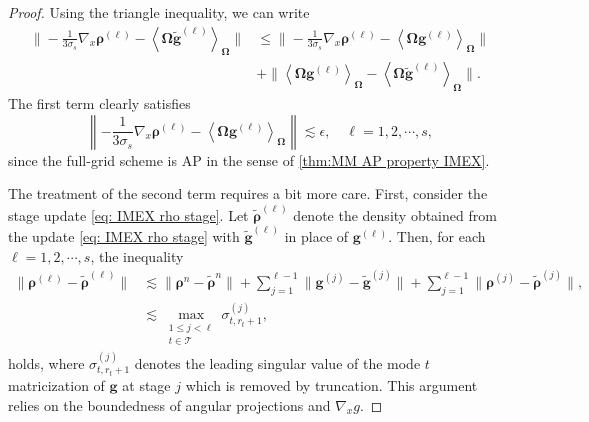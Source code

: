 \documentclass[onefignum,onetabnum]{siamart220329}
\begin{document}
\begin{proof}
    Using the triangle inequality, we can write
    \begin{align*}
        \Bigg\lVert -\frac{1}{3\sigma_s} \nabla_x \boldsymbol{\rho}^{(\ell)} - \left\langle \mathbf{\Omega} \widetilde{\mathbf{g}}^{(\ell)} \right\rangle_{\mathbf{\Omega}} \Bigg\rVert &\leq \Bigg\lVert -\frac{1}{3\sigma_s} \nabla_x \boldsymbol{\rho}^{(\ell)} - \left\langle \mathbf{\Omega} \mathbf{g}^{(\ell)} \right\rangle_{\mathbf{\Omega}} \Bigg\rVert \\ &+ \Bigg\lVert \left\langle \mathbf{\Omega} \mathbf{g}^{(\ell)} \right\rangle_{\mathbf{\Omega}} - \left\langle \mathbf{\Omega}\widetilde{\mathbf{g}}^{(\ell)} \right\rangle_{\mathbf{\Omega}} \Bigg\rVert.
    \end{align*}
    The first term clearly satisfies
    \begin{equation*}
        \left\lVert -\frac{1}{3\sigma_s} \nabla_x \boldsymbol{\rho}^{(\ell)} - \left\langle \mathbf{\Omega} \mathbf{g}^{(\ell)} \right\rangle_{\mathbf{\Omega}} \right\rVert \lesssim \epsilon, \quad \ell = 1,2, \cdots, s,
    \end{equation*}
    since the full-grid scheme is AP in the sense of \cref{thm:MM AP property IMEX}.

    The treatment of the second term requires a bit more care. First, consider the stage update \eqref{eq: IMEX rho stage}. Let $\widetilde{\boldsymbol{\rho}}^{(\ell)}$ denote the density obtained from the update \eqref{eq: IMEX rho stage} with $\widetilde{\mathbf{g}}^{(\ell)}$ in place of $\mathbf{g}^{(\ell)}$. Then, for each $\ell = 1, 2, \cdots, s$, the inequality
    \begin{align}
        \Big\lVert \boldsymbol{\rho}^{(\ell)} - \widetilde{\boldsymbol{\rho}}^{(\ell)} \Big\rVert &\lesssim \Big\lVert \boldsymbol{\rho}^{n} - \widetilde{\boldsymbol{\rho}}^{n} \Big\rVert  + \sum_{j=1}^{\ell-1} \Big\lVert \mathbf{g}^{(j)} - \widetilde{\mathbf{g}}^{(j)} \Big\rVert + \sum_{j=1}^{\ell-1} \Big\lVert \boldsymbol{\rho}^{(j)} - \widetilde{\boldsymbol{\rho}}^{(j)} \Big\rVert, \label{eq:rho stage bound} \\
        &\lesssim \max_{\substack{1 \leq j < \ell \\ t \in \mathcal{T}}} \sigma_{t,r_{t}+1}^{(j)}, \nonumber
    \end{align}
    holds, where $\sigma_{t,r_{t}+1}^{(j)}$ denotes the leading singular value of the mode $t$ matricization of $\mathbf{g}$ at stage $j$ which is removed by truncation. This argument relies on the boundedness of angular projections and $\nabla_{x}g$.


\end{proof}
\end{document}
